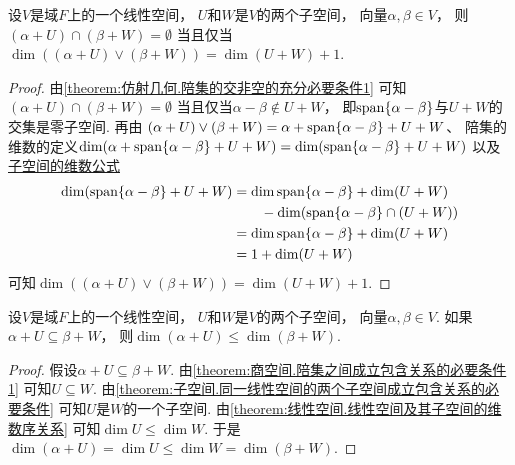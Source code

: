 \begin{theorem}\label{theorem:仿射几何.陪集的交为空的充分必要条件1}
设\(V\)是域\(F\)上的一个线性空间，
\(U\)和\(W\)是\(V\)的两个子空间，
向量\(\alpha,\beta \in V\)，
则\((\alpha + U) \cap (\beta + W) = \emptyset\)
当且仅当\(\dim((\alpha + U) \vee (\beta + W)) = \dim(U + W) + 1\).
\begin{proof}
由\cref{theorem:仿射几何.陪集的交非空的充分必要条件1} 可知
\((\alpha + U) \cap (\beta + W) = \emptyset\)
当且仅当\(\alpha - \beta \notin U + W\)，
即\(\operatorname{span}\{\alpha - \beta\}\)与\(U + W\)的交集是零子空间.
再由 \hyperref[equation:仿射几何.两个陪集的联]{\(
	(\alpha + U) \vee (\beta + W)
	= \alpha + \operatorname{span}\{\alpha - \beta\} + U + W
\)}、
陪集的维数的定义\(
	\dim(\alpha + \operatorname{span}\{\alpha - \beta\} + U + W)
	= \dim(\operatorname{span}\{\alpha - \beta\} + U + W)
\)
以及\hyperref[theorem:线性空间.子空间.子空间的维数公式]{子空间的维数公式}\begin{align*}
	\dim(\operatorname{span}\{\alpha - \beta\} + U + W)
	&= \dim\operatorname{span}\{\alpha - \beta\} + \dim(U + W) \\
	&\hspace{20pt}
		- \dim(\operatorname{span}\{\alpha - \beta\} \cap (U + W)) \\
	&= \dim\operatorname{span}\{\alpha - \beta\} + \dim(U + W) \\
	&= 1 + \dim(U + W)
\end{align*}
可知\(
	\dim((\alpha + U) \vee (\beta + W))
	= \dim(U + W) + 1
\).
\end{proof}
\end{theorem}

\begin{theorem}\label{theorem:商空间.陪集之间成立包含关系的必要条件2}
设\(V\)是域\(F\)上的一个线性空间，
\(U\)和\(W\)是\(V\)的两个子空间，
向量\(\alpha,\beta \in V\).
如果\(\alpha + U \subseteq \beta + W\)，
则\(\dim(\alpha + U) \leq \dim(\beta + W)\).
\begin{proof}
假设\(\alpha + U \subseteq \beta + W\).
由\cref{theorem:商空间.陪集之间成立包含关系的必要条件1}
可知\(U \subseteq W\).
由\cref{theorem:子空间.同一线性空间的两个子空间成立包含关系的必要条件}
可知\(U\)是\(W\)的一个子空间.
由\cref{theorem:线性空间.线性空间及其子空间的维数序关系}
可知\(\dim U \leq \dim W\).
于是\(
	\dim(\alpha + U)
	= \dim U
	\leq \dim W
	= \dim(\beta + W)
\).
\end{proof}
\end{theorem}

